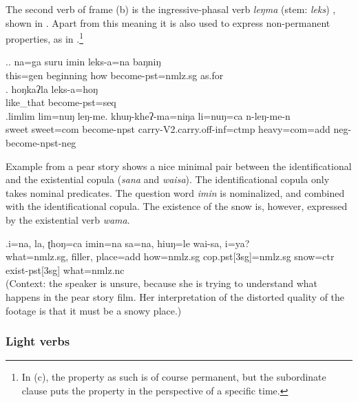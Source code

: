 The second verb of frame (b) is the ingressive-phasal verb \emph{leŋma} (stem: \emph{leks}) , shown in \Next. Apart from this meaning it is also used to express non-permanent properties, as in \Next[c].\footnote{In (c), the property as such is of course permanent, but the subordinate clause puts the property in the perspective of a specific time.}

\ex.\ag. na=ga  suru   imin leks-a=na    baŋniŋ \\
		this{\sc =gen} beginning how become{\sc [3sg]-pst=nmlz.sg} as.for	\\
	 
	\bg.  hoŋkaʔla  leks-a=hoŋ\\
	like\_that become{\sc [3sg]-pst=seq}			\\
 
\bg.limlim lim=nuŋ leŋ-me.     khuŋ-kheʔ-ma=niŋa          li=nuŋ=ca    n-leŋ-me-n\\
sweet sweet{\sc =com} become{\sc [3sg]-npst} carry{\sc -V2.carry.off-inf=ctmp} heavy{\sc =com=add} {\sc neg-}become{\sc [3sg]-npst-neg}\\


Example \Next from a pear story shows a nice minimal pair between the identificational and the existential copula (\emph{sana} and \emph{waisa}). The identificational copula only takes nominal predicates. The question word \emph{imin}  is nominalized, and combined with the identificational copula. The existence of the snow is, however, expressed by the existential  verb \emph{wama}.

\exg.i=na, la, ʈhoŋ=ca       imin=na       sa=na,        hiuŋ=le      wai-sa,  i=ya?\\
what{\sc =nmlz.sg}, {\sc filler}, place{\sc =add} how{\sc =nmlz.sg} {\sc cop.pst[3sg]=nmlz.sg} snow{\sc =ctr} exist{\sc -pst[3sg]} what{\sc =nmlz.nc}\\
 (Context: the speaker is unsure, because she is trying to understand what happens in the pear story film. Her interpretation of the distorted quality of the footage is that it must be a snowy place.)	

\subsubsection{Light verbs}

